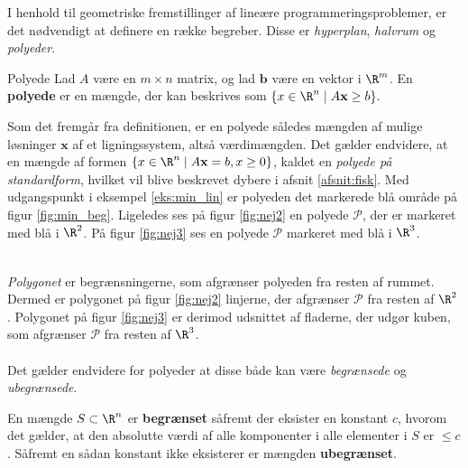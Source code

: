 I henhold til geometriske fremstillinger af lineære programmeringsproblemer, er det nødvendigt at definere en række begreber.
Disse er \textit{hyperplan}, \textit{halvrum} og \textit{polyeder}.
%
\begin{defn}{}{Polyede}
Lad $A$ være en $m \times n$ matrix, og lad $\mathbf{b}$ være en vektor i  $\R^m$.
En \textbf{polyede} er en mængde, der kan beskrives som 
$\{x\in \R^n \mid A\mathbf{x}\geq b\}.$
%
\end{defn}
\noindent
%
Som det fremgår fra definitionen, er en polyede således mængden af mulige løsninger $\mathbf{x}$ af et ligningssystem, altså værdimængden.
Det gælder endvidere, at en mængde af formen $ \{x \in \R^n \mid A\textbf{x}=b,x \geq 0 \}$, kaldet en \textit{polyede på standardform}, hvilket vil blive beskrevet dybere i afsnit \ref{afsnit:fisk}.
%
Med udgangspunkt i eksempel \ref{eks:min_lin} er polyeden   det markerede blå område på figur \ref{fig:min_beg}. 
Ligeledes ses på figur \ref{fig:nej2} en polyede $\mathcal{P}$, der er markeret med blå i $\R^2$. 
På figur \ref{fig:nej3} ses en polyede $\mathcal{P}$ markeret med blå i $\R^3$. 
%
%
\begin{center}
$
\begin{array}{cc}
&

\end{array}
$
\end{center}
%
\textit{Polygonet} er begrænsningerne, som afgrænser polyeden fra resten af rummet. 
Dermed er polygonet på figur \ref{fig:nej2} linjerne, der afgrænser $\mathcal{P}$ fra resten af $\R^2$.
Polygonet på figur \ref{fig:nej3} er derimod udsnittet af fladerne, der udgør kuben, som afgrænser $\mathcal{P}$ fra resten af $\R^3$.
\\\\
%
Det gælder endvidere for polyeder at disse både kan være \textit{begrænsede} og \textit{ubegrænsede}.
%
\begin{defn}{}{}
En mængde $S \subset \R^n$ er \textbf{begrænset} såfremt der eksister en konstant $c$, hvorom det gælder, at den absolutte værdi af alle komponenter i alle elementer i $S$ er $\leq c$. 
Såfremt en sådan konstant ikke eksisterer er mængden \textbf{ubegrænset}. 
\end{defn}
